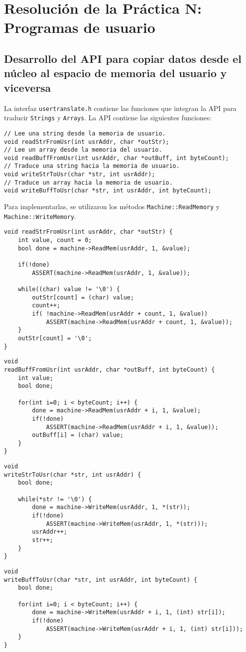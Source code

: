 \chapter{Resolución de la Práctica N: Programas de usuario}
\section{Desarrollo del API para copiar datos desde el núcleo al espacio de memoria del usuario y viceversa}
La interfaz \texttt{usertranslate.h} contiene las funciones que integran la API para traducir \texttt{Strings} y \texttt{Arrays}. La API contiene las siguientes funciones:
\begin{lstlisting}[style=C]
// Lee una string desde la memoria de usuario.
void readStrFromUsr(int usrAddr, char *outStr);
// Lee un array desde la memoria del usuario.
void readBuffFromUsr(int usrAddr, char *outBuff, int byteCount);
// Traduce una string hacia la memoria de usuario.
void writeStrToUsr(char *str, int usrAddr);
// Traduce un array hacia la memoria de usuario.
void writeBuffToUsr(char *str, int usrAddr, int byteCount);
\end{lstlisting}
Para implementarlas, se utilizaron los métodos \texttt{Machine::ReadMemory} y \texttt{Machine::WriteMemory}.
\begin{lstlisting}[style=C]
void readStrFromUsr(int usrAddr, char *outStr) {
    int value, count = 0;
    bool done = machine->ReadMem(usrAddr, 1, &value);
    
    if(!done)
        ASSERT(machine->ReadMem(usrAddr, 1, &value));
        
    while((char) value != '\0') {
        outStr[count] = (char) value;
        count++;
        if( !machine->ReadMem(usrAddr + count, 1, &value))
            ASSERT(machine->ReadMem(usrAddr + count, 1, &value));
    }
    outStr[count] = '\0';
}
\end{lstlisting}
\begin{lstlisting}[style=C]
void
readBuffFromUsr(int usrAddr, char *outBuff, int byteCount) {
    int value;
    bool done;    

    for(int i=0; i < byteCount; i++) {
        done = machine->ReadMem(usrAddr + i, 1, &value);
        if(!done)
            ASSERT(machine->ReadMem(usrAddr + i, 1, &value));
        outBuff[i] = (char) value;
    }
}
\end{lstlisting}
\begin{lstlisting}[style=C]
void
writeStrToUsr(char *str, int usrAddr) {
    bool done;

    while(*str != '\0') {
        done = machine->WriteMem(usrAddr, 1, *(str));
        if(!done)
            ASSERT(machine->WriteMem(usrAddr, 1, *(str)));
        usrAddr++;
        str++;
    }
}
\end{lstlisting}
\begin{lstlisting}[style=C]
void
writeBuffToUsr(char *str, int usrAddr, int byteCount) {
    bool done;

    for(int i=0; i < byteCount; i++) {
        done = machine->WriteMem(usrAddr + i, 1, (int) str[i]);
        if(!done)
            ASSERT(machine->WriteMem(usrAddr + i, 1, (int) str[i]));
    }
}
\end{lstlisting}
